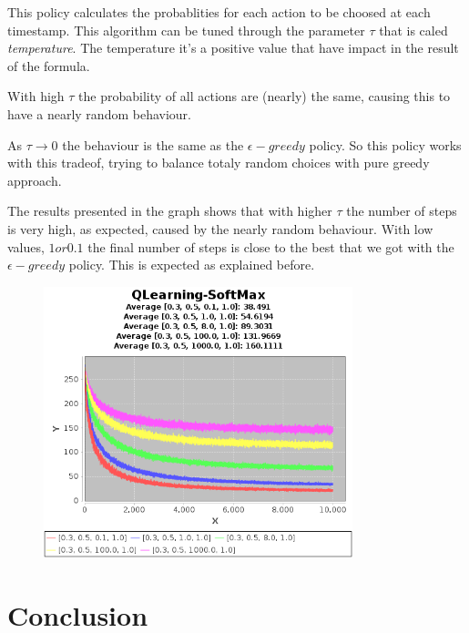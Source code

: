 \documentclass{article}
\begin{document}
This policy calculates the probablities for each action to be choosed at each
timestamp. This algorithm can be tuned through the parameter $\tau$ that is
caled \emph{temperature}.
The temperature it's a positive value that have impact in the result of the
formula.

With high $\tau$ the probability of all actions are (nearly) the same, causing
this to have a nearly random behaviour.

As $\tau \rightarrow 0$ the behaviour is the same as the $\epsilon-greedy$
policy.
So this policy works with this tradeof, trying to balance totaly random choices
with pure greedy approach.

The results presented in the graph shows that with higher $\tau$ the number of
steps is very high, as expected, caused by the nearly random behaviour. With low
values, $1 or 0.1$ the final number of steps is close to the best that we got
with the $\epsilon-greedy$ policy. This is expected as explained before.

\begin{figure}[h]
\centering
\includegraphics[width=0.8\textwidth]{res/alpha_03_gamma_05_temp_01_to_1000_IV_1.png}
\end{figure}

\section{Conclusion}
\end{document}
